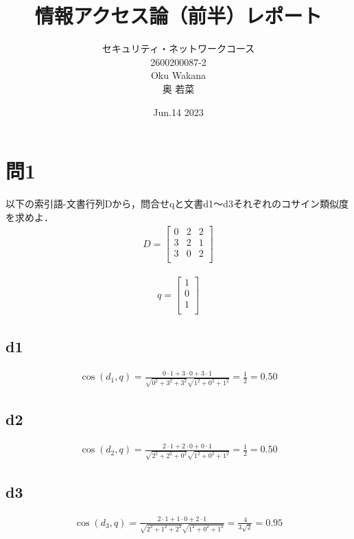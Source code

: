 \documentclass[dvipdfmx,autodetect-engine,titlepage]{jsarticle}
\title{情報アクセス論（前半）レポート\\
}
\author{セキュリティ・ネットワークコース\\2600200087-2\\Oku Wakana\\奥 若菜}
\date{Jun.14 2023}
\begin{document}
\maketitle

\section{問1}
以下の索引語-文書行列Dから，問合せqと文書d1〜d3それぞれのコサイン類似度を求めよ．
\begin{eqnarray*}
  D =
  \begin{bmatrix}
    0 & 2 & 2\\
    3 & 2 & 1\\
    3 & 0 & 2\\
  \end{bmatrix}
\end{eqnarray*}

\begin{eqnarray*}
  q =
  \begin{bmatrix}
    1 \\
    0 \\
    1 \\
  \end{bmatrix}
\end{eqnarray*}

\subsection{d1}

\begin{eqnarray*}
  \cos (d_{1},q) = \frac{0\cdot 1 + 3\cdot 0 + 3\cdot 1}{\sqrt{0^2+3^2+3^2} \sqrt{1^2+0^2+1^2} } 
  = \frac{1}{2} 
  = 0.50
\end{eqnarray*}

\subsection{d2}

\begin{eqnarray*}
  \cos (d_{2},q) = \frac{2\cdot 1 + 2\cdot 0 + 0\cdot 1}{\sqrt{2^2+2^2+0^2} \sqrt{1^2+0^2+1^2} } 
  = \frac{1}{2} 
  = 0.50
\end{eqnarray*}

\subsection{d3}

\begin{eqnarray*}
  \cos (d_{3},q) = \frac{2\cdot 1 + 1\cdot 0 + 2\cdot 1}{\sqrt{2^2+1^2+2^2} \sqrt{1^2+0^2+1^2} } 
  = \frac{4}{3\sqrt{2} } 
  = 0.95
\end{eqnarray*}
　\\
\end{document}
